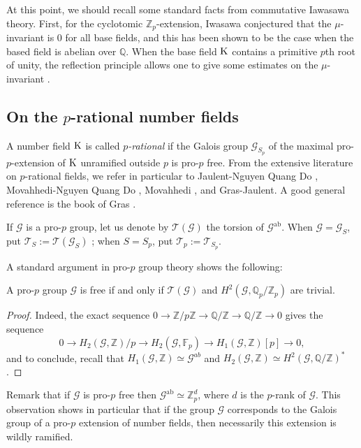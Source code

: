 \documentclass[12pt,a4paper,twoside,english]{smfart}
\def\K{{\rm K}}
\def\Q{{\mathbb Q}}
\def\Z{{\mathbb Z}}
\def\fq{{\mathbb F}}
\def\G{{\mathcal G}}
\def\To{{\mathcal T}}
\def\ab{{\mathrm{ab}}}
\begin{document}
At this point, we should recall some standard facts from commutative Iawasawa theory.  First, for the cyclotomic $\Z_p$-extension, Iwasawa conjectured that 
the $\mu$-invariant is 0 for all base fields, and this has been shown to be the case when the based field is abelian over $\Q$.  When the base field $\K$ contains a primitive $p$th root of unity, the reflection principle allows one to give some
estimates on the $\mu$-invariant  \cite{Perbet2}.




\subsection{On the $p$-rational number fields}\label{section-p-rational}

A number field  $\K$ is called \emph{$p$-rational} if the Galois group $\G_{S_p}$ of the maximal pro-$p$-extension of $\K$ unramified outside $p$ is pro-$p$ free. From the extensive literature on  $p$-rational fields, we refer in particular to Jaulent-Nguyen Quang Do \cite{JN}, Movahhedi-Nguyen Quang Do  \cite{MN}, Movahhedi \cite{M}, and Gras-Jaulent\cite{GJ}.
A good general reference  is the book of Gras \cite{gras}.

\medskip

\begin{defi}
If $\G$ is a pro-$p$ group, let us denote by $\To(\G)$ the torsion of $\G^{\ab}$. 
When $\G=\G_S$, put $\To_S:=\To(\G_S)$ ; when $S=S_p$, put $\To_p:=\To_{S_p}$.
\end{defi}

A standard argument in pro-$p$ group theory shows the following:
\begin{prop}
A pro-$p$ group $\G$ is free if and only if $\To(\G)$ and  $H^2(\G,\Q_p/\Z_p)$ are trivial.
\end{prop}

\begin{proof}
Indeed, the exact sequence $\displaystyle{0 \longrightarrow \Z/p\Z \longrightarrow \Q/\Z \longrightarrow \Q/\Z \longrightarrow 0}$ gives
the sequence $$0 \longrightarrow H_2(\G,\Z)/p  \longrightarrow H_2(\G,\fq_p)  \longrightarrow H_1(\G,\Z)[p]\longrightarrow 0,$$
and to conclude,  recall that $H_1(\G,\Z)\simeq \G^{ab}$ and $H_2(\G,\Z)\simeq H^2(\G,\Q/\Z)^*$.\end{proof}

Remark that  if $\G$ is pro-$p$ free then $\G^{\ab} \simeq \Z_p^d$, where $d$ is the $p$-rank of $\G$.
This observation shows in particular that if  the group $\G$ corresponds to the Galois group of a pro-$p$ extension of number fields, then necessarily this extension is wildly ramified.
\end{document}
